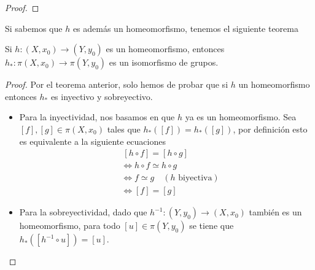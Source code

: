{\begin{proof}
\end{proof}
Si sabemos que \(h\) es además un homeomorfismo, tenemos el siguiente
teorema
\begin{teorema} \label{thm:homoemorfismo-isomorfismo}
Si \(h : (X, x_0) \to (Y,y_0)\) es un homeomorfismo, entonces \(h_{*} :
\pi (X, x_0) \to \pi (Y, y_0)\) es un isomorfismo de grupos.
\end{teorema}
\begin{proof}
Por el teorema anterior, solo hemos de probar que si \(h\) un
homeomorfismo entonces \(h_*\) es inyectivo y sobreyectivo.
\begin{itemize}
  \item Para la inyectividad, nos basamos en que \(h\) ya es un
  homeomorfismo. Sea \([f], [g] \in \pi (X, x_0)\) tales que \(h_* ([f])
  = h_* ([g])\), por definición esto es equivalente a la siguiente
  ecuaciones
  \begin{align*}
    &~ [h \circ f] = [h \circ g] \\
    &\iff h \circ f \simeq h \circ g \\
    &\iff f \simeq g \quad (h \text{ biyectiva}) \\
    &\iff [f] = [g]
  \end{align*}

  \item Para la sobreyectividad, dado que \(h^{-1} :
  (Y,y_0) \to (X, x_0)\) también es un homeomorfismo, para todo \([u] \in
  \pi (Y, y_0) \) se tiene que \(h_{*} ([h^{-1} \circ u]) = [u]\).
\end{itemize}
\end{proof}

}
